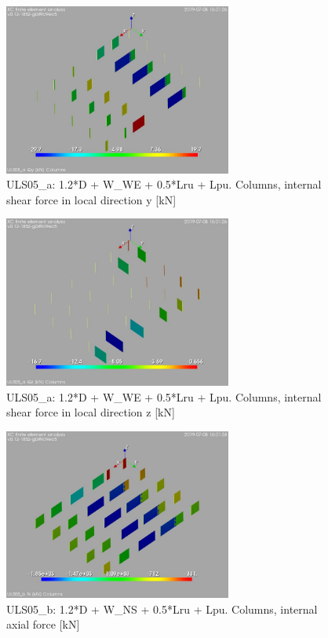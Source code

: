 \begin{figure}
\begin{center}
\includegraphics[width=75mm]{annex_res_columns/graphics/resSimplLC/ULS05_acolumnsQy}
\caption{ULS05\_a: 1.2*D + W\_WE + 0.5*Lru + Lpu. Columns, internal shear force in local direction y [kN]}
\end{center}
\end{figure}
\begin{figure}
\begin{center}
\includegraphics[width=75mm]{annex_res_columns/graphics/resSimplLC/ULS05_acolumnsQz}
\caption{ULS05\_a: 1.2*D + W\_WE + 0.5*Lru + Lpu. Columns, internal shear force in local direction z [kN]}
\end{center}
\end{figure}
\clearpage
\begin{figure}
\begin{center}
\includegraphics[width=75mm]{annex_res_columns/graphics/resSimplLC/ULS05_bcolumnsN}
\caption{ULS05\_b: 1.2*D + W\_NS + 0.5*Lru + Lpu. Columns, internal axial force [kN]}
\end{center}
\end{figure}
